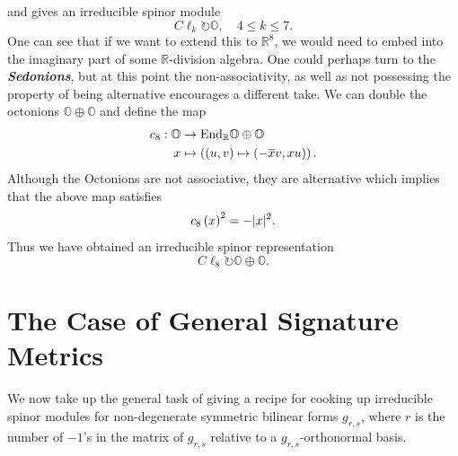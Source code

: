 \documentclass[openany, 11pt]{article}
\theoremstyle{definition}
\theoremstyle{remark}
\def\lp{\ensuremath{\left(}}
\def\rp{\ensuremath{\right)}}
\def\bR{\ensuremath{\mathbb{R}}}
\def\bO{\ensuremath{\mathbb{O}}}
\def\End{\ensuremath{\textnormal{End}}}
\begin{document}
and gives an irreducible spinor module
\[
    C\ell_k\circlearrowright\bO,\quad 4\leq k\leq 7.
\]
One can see that if we want to extend this to $\bR^8$, we would need to embed into the imaginary part of some $\bR$-division algebra. One could perhaps turn to the \textbf{\emph{Sedonions}}, but at this point the non-associativity, as well as not possessing the property of being alternative encourages a different take. We can double the octonions $\bO\oplus\bO$ and define the map
\begin{align*}
    c_8:\bO&\rightarrow\End_{\bR}\bO\oplus\bO\\
    x&\mapsto \lp \lp u,v\rp\mapsto \lp -\overline{x}v,xu\rp\rp.
\end{align*}
Although the Octonions are not associative, they are alternative which implies that the above map satisfies
\[  
    c_8\lp x\rp^2=-|x|^2.
\]
Thus we have obtained an irreducible spinor representation
\[
    C\ell_8\circlearrowright \bO\oplus\bO.
\]
\section{The Case of General Signature Metrics}
We now take up the general task of giving a recipe for cooking up irreducible spinor modules for non-degenerate symmetric bilinear forms $g_{r,s}$, where $r$ is the number of $-1$'s in the matrix of $g_{r,s}$ relative to a $g_{r,s}$-orthonormal basis.\par
\end{document}
